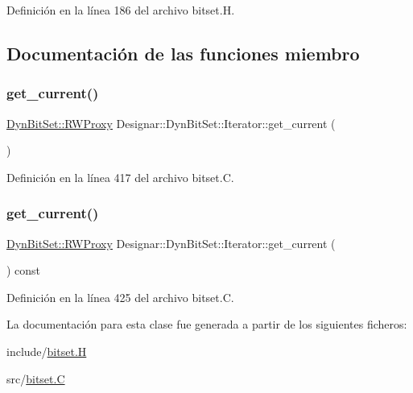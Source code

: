 Definición en la línea 186 del archivo bitset.\+H.



\subsection{Documentación de las funciones miembro}
\mbox{\label{class_designar_1_1_dyn_bit_set_1_1_iterator_a413eba67b23a9400666c18845bbe795a}} 
\subsubsection{\texorpdfstring{get\+\_\+current()}{get\_current()}\hspace{0.1cm}{\footnotesize\ttfamily [1/2]}}
{\footnotesize\ttfamily \hyperlink{class_designar_1_1_dyn_bit_set_1_1_r_w_proxy}{Dyn\+Bit\+Set\+::\+R\+W\+Proxy} Designar\+::\+Dyn\+Bit\+Set\+::\+Iterator\+::get\+\_\+current (\begin{DoxyParamCaption}{ }\end{DoxyParamCaption})}



Definición en la línea 417 del archivo bitset.\+C.

\mbox{\label{class_designar_1_1_dyn_bit_set_1_1_iterator_a034af8ec4f70d792837cab4923799e9f}} 
\subsubsection{\texorpdfstring{get\+\_\+current()}{get\_current()}\hspace{0.1cm}{\footnotesize\ttfamily [2/2]}}
{\footnotesize\ttfamily \hyperlink{class_designar_1_1_dyn_bit_set_1_1_r_w_proxy}{Dyn\+Bit\+Set\+::\+R\+W\+Proxy} Designar\+::\+Dyn\+Bit\+Set\+::\+Iterator\+::get\+\_\+current (\begin{DoxyParamCaption}{ }\end{DoxyParamCaption}) const}



Definición en la línea 425 del archivo bitset.\+C.



La documentación para esta clase fue generada a partir de los siguientes ficheros\+:\begin{DoxyCompactItemize}
\item 
include/\hyperlink{bitset_8_h}{bitset.\+H}\item 
src/\hyperlink{bitset_8_c}{bitset.\+C}\end{DoxyCompactItemize}
